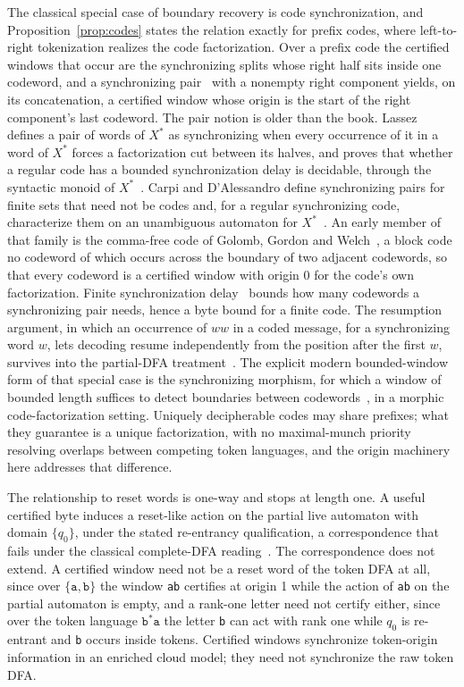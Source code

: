 \documentclass[11pt,a4paper]{article}
\theoremstyle{definition}
\theoremstyle{plain}
\newcommand{\code}[1]{\texttt{#1}}
\begin{document}
The classical special case of boundary recovery is code synchronization, and Proposition~\ref{prop:codes} states the
relation exactly for prefix codes, where left-to-right tokenization realizes the code factorization. Over a prefix code
the certified windows that occur are the synchronizing splits whose right half sits inside one codeword, and a
synchronizing pair~\cite[p.~375]{berstel2010codes} with a nonempty right component yields, on its concatenation, a
certified window whose origin is the start of the right component's last codeword. The pair notion is older than the
book. Lassez defines a pair of words of $X^*$ as synchronizing when every occurrence of it in a word of $X^*$ forces a
factorization cut between its halves, and proves that whether a regular code has a bounded synchronization delay is
decidable, through the syntactic monoid of $X^*$~\cite[Th\'eor\`eme~2]{lassez1976messages}. Carpi and D'Alessandro
define synchronizing pairs for finite sets that need not be codes and, for a regular synchronizing code, characterize
them on an unambiguous automaton for $X^*$~\cite[Definition~2 and Lemma~2(4)]{carpi2017synchronizing}. An early member
of that family is the comma-free code of Golomb, Gordon and Welch~\cite{golomb1958commafree}, a block code no codeword
of which occurs across the boundary of two adjacent codewords, so that every codeword is a certified window with origin
$0$ for the code's own factorization. Finite synchronization delay~\cite{restivo1975synchronization} bounds how many
codewords a synchronizing pair needs, hence a byte bound for a finite code. The resumption argument, in which an
occurrence of $ww$ in a coded message, for a synchronizing word $w$, lets decoding resume independently from the
position after the first $w$, survives into the partial-DFA treatment~\cite{berlinkov2021partial}. The explicit modern
bounded-window form of that special case is the synchronizing morphism, for which a window of bounded length suffices to
detect boundaries between codewords~\cite{fici2025morphisms}, in a morphic code-factorization setting. Uniquely
decipherable codes may share prefixes; what they guarantee is a unique factorization, with no maximal-munch priority
resolving overlaps between competing token languages, and the origin machinery here addresses that difference.

The relationship to reset words is one-way and stops at length one. A useful certified byte induces a reset-like action
on the partial live automaton with domain $\{q_0\}$, under the stated re-entrancy qualification, a correspondence that
fails under the classical complete-DFA reading~\cite{volkov2008synchronizing}. The correspondence does not extend. A
certified window need not be a reset word of the token DFA at all, since over $\{\code{a}, \code{b}\}$ the window
\code{ab} certifies at origin 1 while the action of \code{ab} on the partial automaton is empty, and a rank-one letter
need not certify either, since over the token language $\code{b}^*\code{a}$ the letter \code{b} can act with rank one
while $q_0$ is re-entrant and \code{b} occurs inside tokens. Certified windows synchronize token-origin information in
an enriched cloud model; they need not synchronize the raw token DFA.
\end{document}
